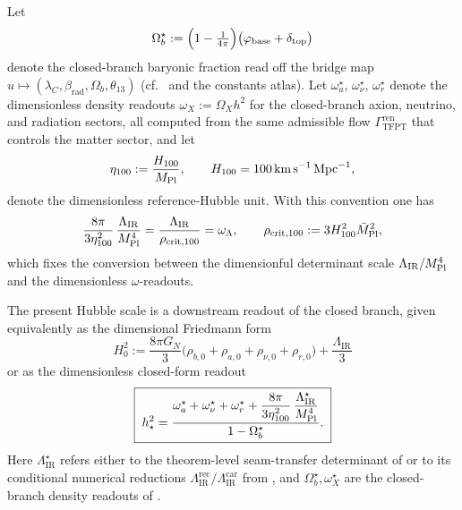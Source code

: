 \begin{definition}
\label{def:closed-branch-density-readouts}
Let
\[
\Omega_b^\star
:=
\Bigl(1-\tfrac{1}{4\pi}\Bigr)\bigl(\varphi_{\mathrm{base}}+\delta_{\mathrm{top}}\bigr)
\]
denote the closed-branch baryonic fraction read off the bridge map
$u\mapsto(\lambda_C,\beta_{\mathrm{rad}},\Omega_b,\theta_{13})$ (cf.\ 
and the constants atlas). Let $\omega_a^\star$, $\omega_\nu^\star$, $\omega_r^\star$ denote the
dimensionless density readouts $\omega_X:=\Omega_X h^2$ for the closed-branch axion, neutrino, and
radiation sectors, all computed from the same admissible flow $\Gamma_{\mathrm{TFPT}}^{\mathrm{ren}}$
that controls the matter sector, and let
\[
\eta_{100}
:=
\frac{H_{100}}{M_{\mathrm{Pl}}},
\qquad
H_{100}=100\,\mathrm{km}\,\mathrm{s}^{-1}\,\mathrm{Mpc}^{-1},
\]
denote the dimensionless reference-Hubble unit. With this convention one has
\[
\frac{8\pi}{3\eta_{100}^2}\,\frac{\Lambda_{\mathrm{IR}}}{M_{\mathrm{Pl}}^4}
=
\frac{\Lambda_{\mathrm{IR}}}{\rho_{\mathrm{crit},100}}
=
\omega_\Lambda,
\qquad
\rho_{\mathrm{crit},100}:=3H_{100}^2\bar M_{\mathrm{Pl}}^2,
\]
which fixes the conversion between the dimensionful determinant scale
$\Lambda_{\mathrm{IR}}/M_{\mathrm{Pl}}^4$ and the dimensionless $\omega$-readouts.
\end{definition}

\begin{conjecture}
\label{cor:late_time_hubble_readout}
The present Hubble scale is a downstream readout of the closed branch, given equivalently as the
dimensional Friedmann form
\[
H_0^2
:=
\frac{8\pi G_N}{3}\bigl(\rho_{b,0}+\rho_{a,0}+\rho_{\nu,0}+\rho_{r,0}\bigr)
+\frac{\Lambda_{\mathrm{IR}}}{3}
\]
or as the dimensionless closed-form readout
\[
\boxed{\;
h_\star^2
=
\frac{
\omega_a^\star+\omega_\nu^\star+\omega_r^\star
+\dfrac{8\pi}{3\eta_{100}^2}\,\dfrac{\Lambda_{\mathrm{IR}}^\star}{M_{\mathrm{Pl}}^4}
}{
1-\Omega_b^\star
}.\;}
\]
Here $\Lambda_{\mathrm{IR}}^\star$ refers either to the theorem-level seam-transfer determinant of
 or to its conditional numerical reductions
$\Lambda_{\mathrm{IR}}^{\mathrm{rec}}/\Lambda_{\mathrm{IR}}^{\mathrm{car}}$ from
, and $\Omega_b^\star,\omega_X^\star$ are the closed-branch
density readouts of .
\end{conjecture}

